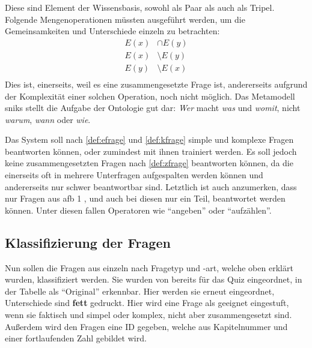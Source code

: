 Diese sind Element der Wissensbasis, sowohl als Paar als auch als Tripel.
Folgende Mengenoperationen müssten ausgeführt werden, um die Gemeinsamkeiten und Unterschiede einzeln zu betrachten:
\begin{align*}
E(x) &\cap E(y) \\
E(x) &\setminus E(y) \\
E(y) &\setminus E(x) \\
\end{align*}
Dies ist, einerseits, weil es eine zusammengesetzte Frage ist, andererseits aufgrund der Komplexität einer solchen Operation, noch nicht möglich.
Das Metamodell \ac{snik}s stellt die Aufgabe der Ontologie gut dar: \emph{Wer} macht \emph{was} und \emph{womit}, nicht \emph{warum}, \emph{wann} oder \emph{wie}.

Das System soll nach \cref{def:efrage} und \cref{def:kfrage} simple und komplexe Fragen beantworten können, oder zumindest mit ihnen trainiert werden.
Es soll jedoch keine zusammengesetzten Fragen nach \cref{def:zfrage} beantworten können, da die einerseits oft in mehrere Unterfragen aufgespalten werden können
und andererseits nur schwer beantwortbar sind.
Letztlich ist auch anzumerken, dass nur Fragen aus \ac{afb} 1 \citep{afb}, und auch bei diesen nur ein Teil, beantwortet werden können.
Unter diesen fallen Operatoren wie \enquote{angeben} oder \enquote{aufzählen}.

\subsection{Klassifizierung der Fragen}\label{sub:fragenklassifikation}

Nun sollen die Fragen aus \citet{bb} einzeln nach Fragetyp und -art, welche oben erklärt wurden, klassifiziert werden.
Sie wurden von \citet{arneba} bereits für das Quiz eingeordnet, in der Tabelle als \enquote{Original} erkennbar.
Hier werden sie erneut eingeordnet, Unterschiede sind \textbf{fett} gedruckt.
Hier wird eine Frage als geeignet eingestuft, wenn sie faktisch und simpel oder komplex, nicht aber zusammengesetzt sind.
Außerdem wird den Fragen eine ID gegeben, welche aus Kapitelnummer und einer fortlaufenden Zahl gebildet wird.

